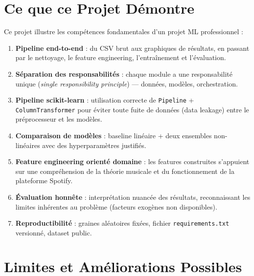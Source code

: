 \documentclass[12pt, a4paper]{article}
\begin{document}
\section{Ce que ce Projet Démontre}

Ce projet illustre les compétences fondamentales d'un projet ML professionnel :

\begin{enumerate}[leftmargin=1.5cm]
  \item \textbf{Pipeline end-to-end} : du CSV brut aux graphiques de résultats, en passant
        par le nettoyage, le feature engineering, l'entraînement et l'évaluation.

  \item \textbf{Séparation des responsabilités} : chaque module a une responsabilité
        unique (\textit{single responsibility principle}) — données, modèles, orchestration.

  \item \textbf{Pipeline scikit-learn} : utilisation correcte de \texttt{Pipeline} +
        \texttt{ColumnTransformer} pour éviter toute fuite de données (data leakage)
        entre le préprocesseur et les modèles.

  \item \textbf{Comparaison de modèles} : baseline linéaire + deux ensembles non-linéaires
        avec des hyperparamètres justifiés.

  \item \textbf{Feature engineering orienté domaine} : les features construites
        s'appuient sur une compréhension de la théorie musicale et du fonctionnement
        de la plateforme Spotify.

  \item \textbf{Évaluation honnête} : interprétation nuancée des résultats, reconnaissant
        les limites inhérentes au problème (facteurs exogènes non disponibles).

  \item \textbf{Reproductibilité} : graines aléatoires fixées, fichier
        \texttt{requirements.txt} versionné, dataset public.
\end{enumerate}

\section{Limites et Améliorations Possibles}
\end{document}
